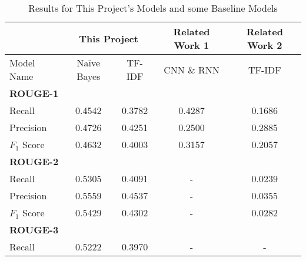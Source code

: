 \documentclass{IEEEtran}
\begin{document}
\begin{table}[h]
\centering
\caption{Results for This Project's Models and some Baseline Models}
\begin{tabular}{|lcccc|}
\hline
\multicolumn{1}{|l|}{}              & \multicolumn{2}{c|}{This Project}                                 & \multicolumn{1}{c|}{Related Work 1}    & Related Work 2 \\ \hline
\multicolumn{1}{|l|}{Model Name}    & \multicolumn{1}{c|}{Na\"{i}ve Bayes} & \multicolumn{1}{c|}{TF-IDF}    & \multicolumn{1}{c|}{CNN \& RNN} & TF-IDF         \\ \hline
\multicolumn{5}{|l|}{\textbf{ROUGE-1}}                                                                                                                            \\ \hline
\multicolumn{1}{|l|}{Recall}        & \multicolumn{1}{c|}{0.4542}      & \multicolumn{1}{c|}{0.3782}    & \multicolumn{1}{c|}{0.4287}            & 0.1686         \\ \hline
\multicolumn{1}{|l|}{Precision}     & \multicolumn{1}{c|}{0.4726}      & \multicolumn{1}{c|}{0.4251}    & \multicolumn{1}{c|}{0.2500}            & 0.2885         \\ \hline
\multicolumn{1}{|l|}{$F_1$ Score}    & \multicolumn{1}{c|}{0.4632}      & \multicolumn{1}{c|}{0.4003}    & \multicolumn{1}{c|}{0.3157}            & 0.2057         \\ \hline
\multicolumn{5}{|l|}{\textbf{ROUGE-2}}                                                                                                                            \\ \hline
\multicolumn{1}{|l|}{Recall}        & \multicolumn{1}{c|}{0.5305}      & \multicolumn{1}{c|}{0.4091}    & \multicolumn{1}{c|}{-}                 & 0.0239         \\ \hline
\multicolumn{1}{|l|}{Precision}     & \multicolumn{1}{c|}{0.5559}      & \multicolumn{1}{c|}{0.4537}    & \multicolumn{1}{c|}{-}                 & 0.0355         \\ \hline
\multicolumn{1}{|l|}{$F_1$ Score}    & \multicolumn{1}{c|}{0.5429}      & \multicolumn{1}{c|}{0.4302}    & \multicolumn{1}{c|}{-}                 & 0.0282         \\ \hline
\multicolumn{5}{|l|}{\textbf{ROUGE-3}}                                                                                                                            \\ \hline
\multicolumn{1}{|l|}{Recall}        & \multicolumn{1}{c|}{0.5222}      & \multicolumn{1}{c|}{0.3970}    & \multicolumn{1}{c|}{-}                 & -              \\ \hline

\end{tabular}
\end{table}
\end{document}
